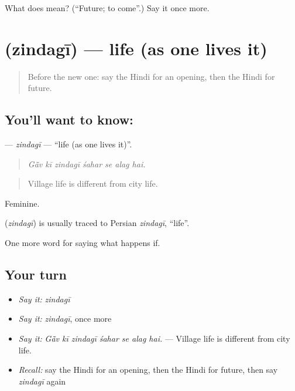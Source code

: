 \begin{tcolorbox}[breakable,colback=teal!4,colframe=teal!35!black,title={Before you move on}]
What does  mean? (\textquotedblleft{}Future; to come\textquotedblright{}.) Say it once more.
\end{tcolorbox}
\section[\texorpdfstring{\hi{ज़िंदगी} (zindagī)}{ज़िंदगी (zindagī)}]{ (zindagī) — life (as one lives it)}

\label{lesson:HI-C559-zindagi}



\begin{quote}
Before the new one: say the Hindi for an opening, then the Hindi for future.
\end{quote}

\subsection*{You'll want to know: }
\textbf{} — \emph{zindagī} — \textquotedblleft{}life (as one lives it)\textquotedblright{}.

\begin{quote}
      
\end{quote}

\begin{quote}
\emph{Gā̃v kī zindagī śahar se alag hai.}
\end{quote}

\begin{quote}
Village life is different from city life.
\end{quote}

Feminine.

\begin{cousinweb}
\textbf{} (\emph{zindagī}) is usually traced to Persian \emph{zindagī}, \textquotedblleft{}life\textquotedblright{}.
\end{cousinweb}

\begin{grammarlens}[title={What you've built}]
One more word for saying what happens if.
\end{grammarlens}

\subsection*{Your turn}
\begin{itemize}
\raggedright
  \item \emph{Say it:} \emph{zindagī}
  \item \emph{Say it:} \emph{zindagī}, once more
  \item \emph{Say it:} \emph{Gā̃v kī zindagī śahar se alag hai.} — Village life is different from city life.
  \item \emph{Recall:} say the Hindi for an opening, then the Hindi for future, then say \emph{zindagī} again
\end{itemize}

